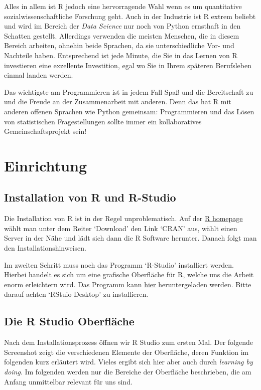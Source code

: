 \documentclass[]{book}
\begin{document}
Alles in allem ist R jedoch eine hervorragende Wahl wenn es um
quantitative sozialwissenschaftliche Forschung geht. Auch in der
Industrie ist R extrem beliebt und wird im Bereich der \emph{Data
Science} nur noch von Python ernsthaft in den Schatten gestellt.
Allerdings verwenden die meisten Menschen, die in diesem Bereich
arbeiten, ohnehin beide Sprachen, da sie unterschiedliche Vor- und
Nachteile haben. Entsprechend ist jede Minute, die Sie in das Lernen von
R investieren eine exzellente Investition, egal wo Sie in Ihrem späteren
Berufsleben einmal landen werden.

Das wichtigste am Programmieren ist in jedem Fall Spaß und die
Bereitschaft zu und die Freude an der Zusammenarbeit mit anderen. Denn
das hat R mit anderen offenen Sprachen wie Python gemeinsam:
Programmieren und das Lösen von statistischen Fragestellungen sollte
immer ein kollaboratives Gemeinschaftsprojekt sein!

\chapter{Einrichtung}\label{einrichtung}

\section{Installation von R und
R-Studio}\label{installation-von-r-und-r-studio}

Die Installation von R ist in der Regel unproblematisch. Auf der
\href{https://www.r-project.org/}{R homepage} wählt man unter dem Reiter
`Download' den Link `CRAN' aus, wählt einen Server in der Nähe und lädt
sich dann die R Software herunter. Danach folgt man den
Installationshinweisen.

Im zweiten Schritt muss noch das Programm `R-Studio' installiert werden.
Hierbei handelt es sich um eine grafische Oberfläche für R, welche uns
die Arbeit enorm erleichtern wird. Das Programm kann
\href{https://www.rstudio.com/products/rstudio/download/}{hier}
heruntergeladen werden. Bitte darauf achten `RStuio Desktop' zu
installieren.

\section{Die R Studio Oberfläche}\label{die-r-studio-oberflache}

Nach dem Installationsprozess öffnen wir R Studio zum ersten Mal. Der
folgende Screenshot zeigt die verschiedenen Elemente der Oberfläche,
deren Funktion im folgenden kurz erläutert wird. Vieles ergibt sich hier
aber auch durch \emph{learning by doing}. Im folgenden werden nur die
Bereiche der Oberfläche beschrieben, die am Anfang unmittelbar relevant
für uns sind.
\end{document}
